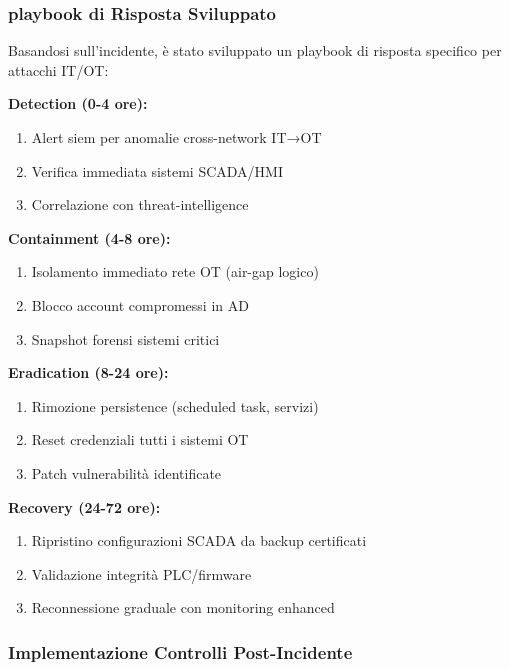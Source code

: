\subsubsection{\texorpdfstring{\gls{playbook} di Risposta Sviluppato}{4.5.2.3 - Playbook di Risposta Sviluppato}}

Basandosi sull'incidente, è stato sviluppato un \gls{playbook} di risposta specifico per attacchi IT/OT:

\textbf{Detection (0-4 ore):}
\begin{enumerate}
    \item Alert \gls{siem} per anomalie cross-network IT→OT
    \item Verifica immediata sistemi SCADA/HMI
    \item Correlazione con \gls{threat-intelligence}
\end{enumerate}

\textbf{Containment (4-8 ore):}
\begin{enumerate}
    \item Isolamento immediato rete OT (air-gap logico)
    \item Blocco account compromessi in AD
    \item Snapshot forensi sistemi critici
\end{enumerate}

\textbf{Eradication (8-24 ore):}
\begin{enumerate}
    \item Rimozione persistence (scheduled task, servizi)
    \item Reset credenziali tutti i sistemi OT
    \item Patch vulnerabilità identificate
\end{enumerate}

\textbf{Recovery (24-72 ore):}
\begin{enumerate}
    \item Ripristino configurazioni SCADA da backup certificati
    \item Validazione integrità PLC/firmware
    \item Reconnessione graduale con monitoring enhanced
\end{enumerate}

\subsubsection{\texorpdfstring{Implementazione Controlli Post-Incidente}{4.5.2.4 - Implementazione Controlli Post-Incidente}}

